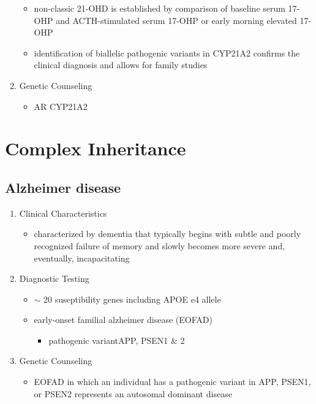 \documentclass[12pt]{scrartcl}
\begin{document}
\begin{enumerate}
\begin{itemize}
\item non-classic 21-OHD is established by comparison of baseline serum
17-OHP and ACTH-stimulated serum 17-OHP or early morning elevated
17-OHP
\item identification of biallelic pathogenic variants in CYP21A2 confirms
the clinical diagnosis and allows for family studies
\end{itemize}
\item Genetic Counseling
\label{sec:org260ecc4}
\begin{itemize}
\item AR CYP21A2
\end{itemize}
\end{enumerate}

\section{Complex Inheritance}
\label{sec:org7f60ccb}
\subsection{Alzheimer disease}
\label{sec:orga26bb12}
\begin{enumerate}
\item Clinical Characteristics
\label{sec:orgebb629f}
\begin{itemize}
\item characterized by dementia that typically begins with subtle and
poorly recognized failure of memory and slowly becomes more severe
and, eventually, incapacitating
\end{itemize}
\item Diagnostic Testing
\label{sec:org10a4fd0}
\begin{itemize}
\item \(\sim\) 20 suseptibility genes including APOE e4 allele
\item early-onset familial alzheimer disease (EOFAD)
\begin{itemize}
\item pathogenic variantAPP, PSEN1 \& 2
\end{itemize}
\end{itemize}
\item Genetic Counseling
\label{sec:org3b74d59}
\begin{itemize}
\item EOFAD in which an individual has a pathogenic variant in APP, PSEN1,
or PSEN2 represents an autosomal dominant disease
\end{itemize}
\end{enumerate}
\end{document}
